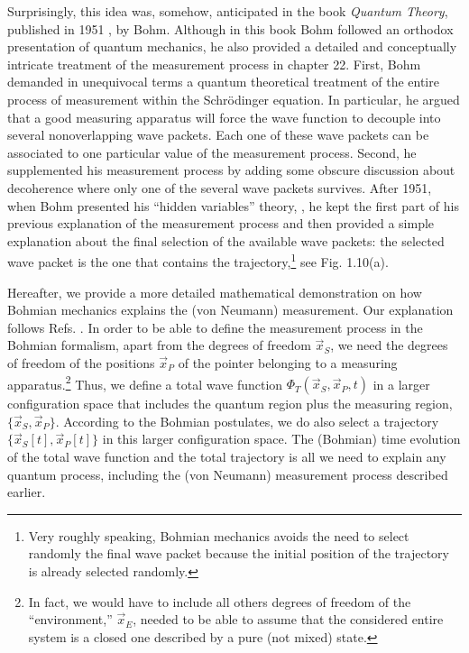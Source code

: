 \documentclass[onecolumn,nofootinbib, secnumarabic, amsmath, nobibnotes,12pt,aps,pra]{revtex4-1}
\begin{document}
Surprisingly, this idea was, somehow, anticipated in the book
\textit{Quantum Theory}, published in 1951 \cite{om.bohmbook}, by
Bohm. Although in this book Bohm followed an orthodox presentation
of quantum mechanics, he also provided a detailed and conceptually
intricate treatment of the measurement process in chapter 22. First,
Bohm demanded in unequivocal terms a quantum theoretical treatment
of the entire process of measurement within the Schr\"odinger
equation. In particular, he argued that a good measuring apparatus
will force the wave function to decouple into several nonoverlapping
wave packets. Each one of these wave packets can be associated to
one particular value of the measurement process. Second, he
supplemented his measurement process by adding some obscure
discussion about decoherence where only one of the several wave
packets survives. After 1951, when Bohm presented his ``hidden
variables'' theory, \cite{om.bohm1952a,om.bohm1952b}, he kept the
first part of his previous explanation of the measurement process
and then provided a simple explanation about the final selection of
the available wave packets: the selected wave packet is the one that
contains the trajectory,\footnote{Very roughly speaking, Bohmian
mechanics avoids the need to select randomly the final wave packet
because the initial position of the trajectory is already selected
randomly.} see Fig. 1.10(a).\enlargethispage{1pc}

Hereafter, we provide a more detailed mathematical demonstration on
how Bohmian mechanics explains the (von Neumann) measurement. Our
explanation follows Refs.
\cite{om.Holand1993,om.bomhhiley1993,om.Durrnaive,om.Durrllibre}. In
order to be able to define the measurement process in the Bohmian
formalism, apart from the degrees of freedom $\vec x_S$, we need the
degrees of freedom of the positions $\vec x_P$ of the pointer belonging to a measuring apparatus.\footnote{In fact, we would have
to include all others degrees of freedom of the ``environment,''
${\vec x_E}$, needed to be able to assume that the considered entire
system is a closed one described by a pure (not mixed)
state.} Thus, we define a total wave function
$\Phi_T(\vec x_S,\vec x_P,t)$ in a larger configuration space that
includes the quantum region plus the measuring region, $\{\vec
x_S,\vec x_P\}$. According to the Bohmian postulates, we do also
select a trajectory $\{\vec x_S[t],\vec x_P[t]\}$ in this larger
configuration space. The (Bohmian) time evolution of the total wave
function and the total trajectory is all we need to explain any
quantum process, including the (von Neumann) measurement process
described earlier.
\end{document}
